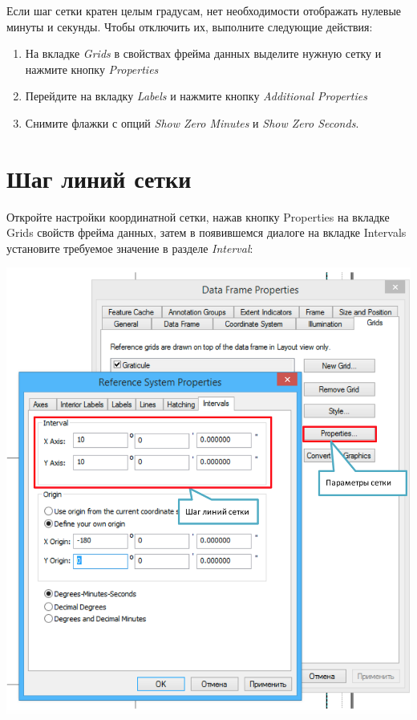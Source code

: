 \documentclass[]{book}
\theoremstyle{definition}
\theoremstyle{definition}
\theoremstyle{definition}
\theoremstyle{remark}
\begin{document}
Если шаг сетки кратен целым градусам, нет необходимости отображать
нулевые минуты и секунды. Чтобы отключить их, выполните следующие
действия:

\begin{enumerate}
\def\labelenumi{\arabic{enumi}.}
\item
  На вкладке \emph{Grids} в свойствах фрейма данных выделите нужную
  сетку и нажмите кнопку \emph{Properties}
\item
  Перейдите на вкладку \emph{Labels} и нажмите кнопку \emph{Additional
  Properties}
\item
  Снимите флажки с опций \emph{Show Zero Minutes} и \emph{Show Zero
  Seconds}.
\end{enumerate}

\hypertarget{--}{%
\section{Шаг линий сетки}\label{--}}

Откройте настройки координатной сетки, нажав кнопку Properties на
вкладке Grids свойств фрейма данных, затем в появившемся диалоге на
вкладке Intervals установите требуемое значение в разделе
\emph{Interval}:

\includegraphics{images/Appendix/image66.png}
\end{document}
